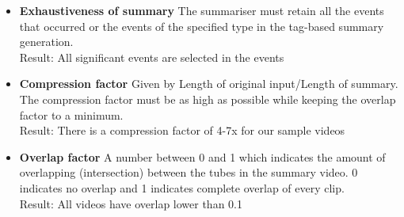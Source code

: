     \begin{itemize}
        \item \textbf{Exhaustiveness of summary}
        The summariser must retain all the events that occurred or the events
        of the specified type in the tag-based summary generation. \\
        Result: All significant events are selected in the events
        \item \textbf{Compression factor}
        Given by Length of original input/Length of summary. The compression
        factor must be as high as possible while keeping the overlap factor to
        a minimum. \\
        Result: There is a compression factor of 4-7x for our sample videos

        \begin{center}
        \end{center}


        \item \textbf{Overlap factor}
        A number between 0 and 1 which indicates the amount of overlapping
        (intersection) between the tubes in the summary video. 0 indicates no
        overlap and 1 indicates complete overlap of every clip. \\
        Result: All videos have overlap lower than 0.1
    \end{itemize}

